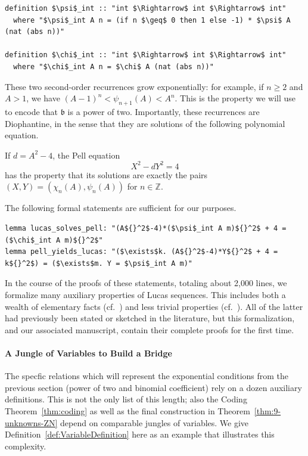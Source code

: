 \documentclass[a4paper,USenglish,cleveref,autoref,thm-restate]{lipics-v2021}
\newcommand{\Z}{{\mathbb Z}}
\newcommand{\bLowercase}{\mathfrak{b}}
\begin{document}
\begin{lstlisting}
definition $\psi$_int :: "int $\Rightarrow$ int $\Rightarrow$ int"
  where "$\psi$_int A n = (if n $\geq$ 0 then 1 else -1) * $\psi$ A (nat (abs n))"

definition $\chi$_int :: "int $\Rightarrow$ int $\Rightarrow$ int"
  where "$\chi$_int A n = $\chi$ A (nat (abs n))"
\end{lstlisting}

These two second-order recurrences grow exponentially: for example, if $n \ge 2$ and $A>1$, we have $(A-1)^n < \psi_{n+1}(A) < A^n$. This is the property we will use to encode that $\bLowercase$ is a power of two. Importantly, these recurrences are Diophantine, in the sense that they are solutions of the following polynomial equation.

\begin{lemma}
\label{lem:PellEquation}
If $d=A^2-4$, the Pell equation
\begin{equation}
    X^2-dY^2=4
\end{equation}
has the property that its solutions are exactly the pairs $(X,Y)=(\chi_n(A),\psi_n(A))$ for $n\in\Z$.
\end{lemma}
The following formal statements are sufficient for our purposes. 

\begin{lstlisting}
lemma lucas_solves_pell: "(A${}^2$-4)*($\psi$_int A m)${}^2$ + 4 = ($\chi$_int A m)${}^2$"
lemma pell_yields_lucas: "($\exists$k. (A${}^2$-4)*Y${}^2$ + 4 = k${}^2$) = ($\exists$m. Y = $\psi$_int A m)"
\end{lstlisting}
In the course of the proofs of these statements, totaling about 2,000 lines, we formalize many auxiliary properties of Lucas sequences. This includes both a wealth of elementary facts (cf.~\cite[Lemma~3.4]{manuscript}) and less trivial properties (cf.~\cite[Lemmas~3.7--3.12]{manuscript}). All of the latter had previously been stated or sketched in the literature, but this formalization, and our associated manuscript, contain their complete proofs for the first time.

\paragraph*{A Jungle of Variables to Build a Bridge}

The specfic relations which will represent the exponential conditions from the previous section (power of two and binomial coefficient) rely on a dozen auxiliary definitions. This is not the only list of this length; also the Coding Theorem~\ref{thm:coding} as well as the final construction in Theorem~\ref{thm:9-unknowns-ZN} depend on comparable jungles of variables. We give Definition~\ref{def:VariableDefinition} here as an example that illustrates this complexity.
\end{document}
